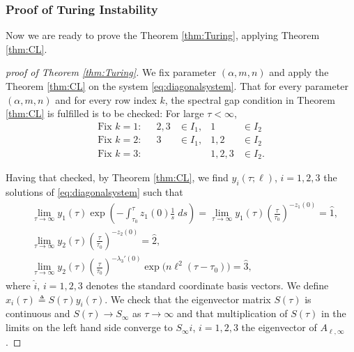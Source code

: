 \documentclass[a4paper,11pt]{article}
\def\l{{\ell}}
\theoremstyle{remark}
\begin{document}
\subsubsection{Proof of Turing Instability}
Now we are ready to prove the Theorem \ref{thm:Turing}, applying Theorem \ref{thm:CL}.
\begin{proof}[proof of Theorem \ref{thm:Turing}]
We fix parameter $(\alpha,m,n)$ and apply the Theorem \ref{thm:CL} on the system \eqref{eq:diagonalsystem}. That for every parameter $(\alpha,m,n)$ and for every row index $k$, the spectral gap condition in Theorem \ref{thm:CL} is fulfilled is to be checked:
For large $\tau<\infty$,
\begin{align*}
  \text{Fix $k=1$:}&& 2,3&\in I_1, & 1&\in I_2\\
  \text{Fix $k=2$:}&& 3&\in I_1, & 1,2&\in I_2\\
  \text{Fix $k=3$:}&& & & 1,2,3&\in I_2.
\end{align*}

Having that checked, by Theorem \ref{thm:CL}, we find $y_i(\tau;\ell)$, $i=1,2,3$ the solutions of \eqref{eq:diagonalsystem} such that
 \begin{align*}
 &\lim_{\tau \rightarrow \infty} y_1(\tau) \exp\left(-\int_{\tau_0}^\tau z_1(0)\frac{1}{s}\; ds\right) = \lim_{\tau \rightarrow \infty} y_1(\tau)\left(\frac{\tau}{\tau_0}\right)^{-z_1(0)} = \hat{1}, \\
 &\lim_{\tau \rightarrow \infty} y_2(\tau)\left(\frac{\tau}{\tau_0}\right)^{-z_2(0)} = \hat{2}, \\
 &\lim_{\tau \rightarrow \infty} y_2(\tau)\left(\frac{\tau}{\tau_0}\right)^{-\lambda_3'(0)}\exp\Big(n\l^2(\tau-\tau_0)\Big) = \hat{3},
 \end{align*}
 where $\hat{i}$, $i=1,2,3$ denotes the standard coordinate basis vectors. We define $x_i(\tau)\triangleq S(\tau)y_i(\tau)$. We check that the eigenvector matrix $S(\tau)$ is continuous and $S(\tau) \rightarrow S_\infty$ as $\tau \rightarrow \infty$ and that multiplication of $S(\tau)$ in the limits on the left hand side converge to $S_\infty \hat{i}$, $i=1,2,3$ the eigenvector of $A_{\ell,\infty}$.


\end{proof}
\end{document}

